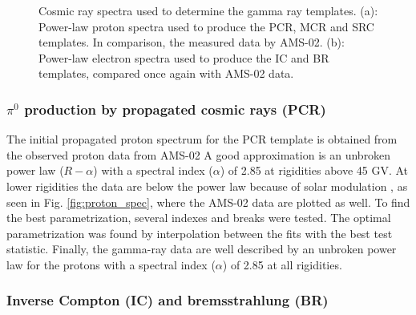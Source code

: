 \begin{figure}[h]
\begin{minipage}[h]{0.45\textwidth}
	  \subcaption{}
	  \label{fig:electron_spec}
  \end{minipage}
  \caption{Cosmic ray spectra used to determine the gamma ray templates. (a): Power-law proton spectra used to produce the PCR, MCR and SRC templates. In comparison, the measured data by AMS-02. (b): Power-law electron spectra used to produce the IC and BR templates, compared once again with AMS-02 data.}
  \label{fig:cosmic_ray_spec}
\end{figure}


\subsubsection{$\pi^0$ production by propagated cosmic rays (PCR)}

The initial propagated proton spectrum for the PCR template is obtained from the observed proton data from AMS-02 %
A good approximation is an unbroken power law ($R-\alpha$) with a spectral index ($\alpha$) of 2.85 at rigidities above 45 GV. At lower rigidities the data are below the power law because of solar modulation %
, as seen in Fig. \ref{fig:proton_spec}, where the AMS-02 data are plotted as well. To find the best parametrization, several indexes and breaks were tested. The optimal parametrization was found by interpolation between the fits with the best test statistic.
Finally, the gamma-ray data are well described by an unbroken power law for the protons with a spectral index ($\alpha$) of 2.85 at all rigidities.\\



\subsubsection{Inverse Compton (IC) and bremsstrahlung (BR)}

